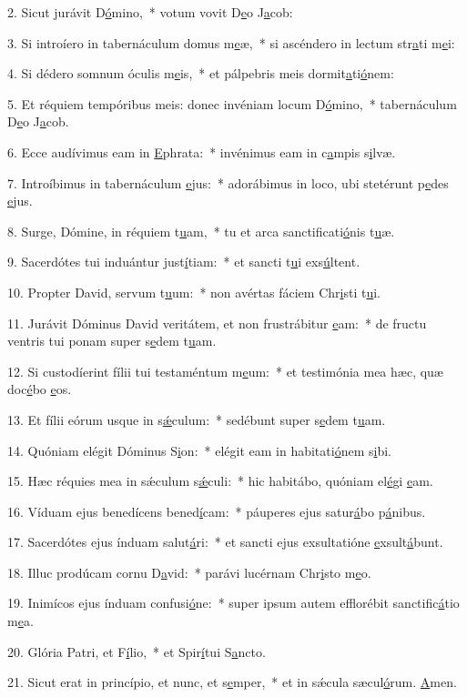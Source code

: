 2. Sicut jurávit D\uline{ó}mino,~* votum vovit D\uline{e}o J\uline{a}cob:\par 
3. Si introíero in tabernáculum domus m\uline{e}æ,~* si ascéndero in lectum str\uline{a}ti m\uline{e}i:\par 
4. Si dédero somnum óculis m\uline{e}is,~* et pálpebris meis dormit\uline{a}ti\uline{ó}nem:\par 
5. Et réquiem tempóribus meis: donec invéniam locum D\uline{ó}mino,~* tabernáculum D\uline{e}o J\uline{a}cob.\par 
6. Ecce audívimus eam in \uline{E}phrata:~* invénimus eam in c\uline{a}mpis s\uline{i}lvæ.\par 
7. Introíbimus in tabernáculum \uline{e}jus:~* adorábimus in loco, ubi stetérunt p\uline{e}des \uline{e}jus.\par 
8. Surge, Dómine, in réquiem t\uline{u}am,~* tu et arca sanctificati\uline{ó}nis t\uline{u}æ.\par 
9. Sacerdótes tui induántur just\uline{í}tiam:~* et sancti t\uline{u}i exs\uline{ú}ltent.\par 
10. Propter David, servum t\uline{u}um:~* non avértas fáciem Chr\uline{i}sti t\uline{u}i.\par 
11. Jurávit Dóminus David veritátem, et non frustrábitur \uline{e}am:~* de fructu ventris tui ponam super s\uline{e}dem t\uline{u}am.\par 
12. Si custodíerint fílii tui testaméntum m\uline{e}um:~* et testimónia mea hæc, quæ doc\uline{é}bo \uline{e}os.\par 
13. Et fílii eórum usque in s\uline{ǽ}culum:~* sedébunt super s\uline{e}dem t\uline{u}am.\par 
14. Quóniam elégit Dóminus S\uline{i}on:~* elégit eam in habitati\uline{ó}nem s\uline{i}bi.\par 
15. Hæc réquies mea in sǽculum s\uline{ǽ}culi:~* hic habitábo, quóniam el\uline{é}gi \uline{e}am.\par 
16. Víduam ejus benedícens bened\uline{í}cam:~* páuperes ejus satur\uline{á}bo p\uline{á}nibus.\par 
17. Sacerdótes ejus índuam salut\uline{á}ri:~* et sancti ejus exsultatióne \uline{e}xsult\uline{á}bunt.\par 
18. Illuc prodúcam cornu D\uline{a}vid:~* parávi lucérnam Chr\uline{i}sto m\uline{e}o.\par 
19. Inimícos ejus índuam confusi\uline{ó}ne:~* super ipsum autem efflorébit sanctific\uline{á}tio m\uline{e}a.\par 
20. Glória Patri, et F\uline{í}lio,~* et Spir\uline{í}tui S\uline{a}ncto.\par 
21. Sicut erat in princípio, et nunc, et s\uline{e}mper,~* et in sǽcula sæcul\uline{ó}rum. \uline{A}men.\par 
